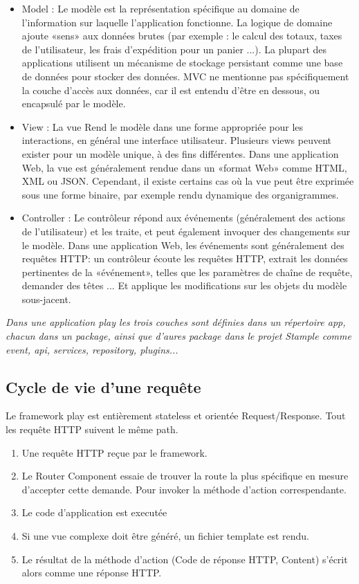 \documentclass[12pt,oneside,a4paper]{article}
\begin{document}
\begin{itemize}
\item Model : Le modèle est la représentation spécifique au domaine de l'information sur laquelle l'application fonctionne. La logique de domaine ajoute «sens» aux données brutes (par exemple : le calcul des totaux, taxes de l'utilisateur, les frais d'expédition pour un panier ...). La plupart des applications utilisent un mécanisme de stockage persistant comme une base de données pour stocker des données. MVC ne mentionne pas spécifiquement la couche d'accès aux données, car il est entendu d'être en dessous, ou encapsulé par le modèle.
\item View : La vue Rend le modèle dans une forme appropriée pour les interactions, en général une interface utilisateur. Plusieurs views peuvent exister pour un modèle unique, à des fins différentes. Dans une application Web, la vue est généralement rendue dans un «format Web» comme HTML, XML ou JSON. Cependant, il existe certains cas où la vue peut être exprimée sous une forme binaire, par exemple rendu dynamique des organigrammes.
\item Controller : Le contrôleur répond aux événements (généralement des actions de l'utilisateur) et les traite, et peut également invoquer des changements sur le modèle. Dans une application Web, les événements sont généralement des requêtes HTTP: un contrôleur écoute les requêtes HTTP, extrait les données pertinentes de la «événement», telles que les paramètres de chaîne de requête, demander des têtes ... Et applique les modifications sur les objets du modèle sous-jacent.

\end{itemize}

\textit{Dans une application play les trois couches sont définies dans un répertoire app, chacun dans un package, ainsi que d'aures package dans le projet Stample comme event, api, services, repository, plugins...}
\newline
\subsection{Cycle de vie d'une requête}
Le framework play est entièrement stateless et orientée Request/Response. Tout les requête HTTP suivent le même path.
\begin{enumerate}
\item Une requête HTTP reçue par le framework.
\item Le Router Component essaie de trouver la route la plus spécifique en mesure d'accepter cette demande. Pour invoker la méthode d'action correspendante. 
\item Le code d'application est executée
\item Si une vue complexe doit être généré, un fichier template est rendu.
\item Le résultat de la méthode d'action (Code de réponse HTTP, Content) s'écrit alors comme une réponse HTTP.
\end{enumerate}
\end{document}

